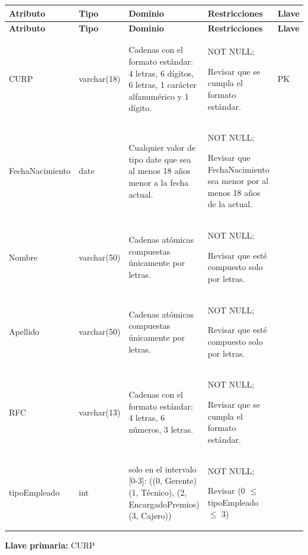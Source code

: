 \documentclass[12pt]{article}
\begin{document}
\begin{longtable}{p{3.2cm} p{2.2cm} p{4.8cm} p{4.2cm} p{1.2cm}}
\label{tab:empleado}\\
\toprule
\textbf{Atributo} & \textbf{Tipo} & \textbf{Dominio} & \textbf{Restricciones} & \textbf{Llave} \\
\midrule
\endfirsthead

\toprule
\textbf{Atributo} & \textbf{Tipo} & \textbf{Dominio} & \textbf{Restricciones} & \textbf{Llave} \\
\midrule
\endhead

\bottomrule
\endfoot

CURP 
& varchar(18) 
& Cadenas con el formato estándar: 4 letras, 6 dígitos, 6 letras, 1 carácter alfanumérico y 1 dígito.
& NOT NULL;

Revisar que se cumpla el formato estándar.
& PK \\

FechaNacimiento 
& date 
& Cualquier valor de tipo date que sea al menos 18 años menor a la fecha actual.
& NOT NULL;

Revisar que FechaNacimiento sea menor por al menos 18 años de la actual.
& \\

Nombre 
& varchar(50)
& Cadenas atómicas compuestas únicamente por letras.
& NOT NULL;

Revisar que esté compuesto solo por letras.
& \\

Apellido 
& varchar(50) 
& Cadenas atómicas compuestas únicamente por letras.
& NOT NULL;

Revisar que esté compuesto solo por letras.
& \\

RFC 
& varchar(13) 
& Cadenas con el formato estándar: 4 letras, 6 números, 3 letras.
& NOT NULL;

Revisar que se cumpla el formato estándar.
& \\

tipoEmpleado
& int
& solo en el intervalo [0-3]: ((0, Gerente) (1, Técnico), (2, EncargadoPremios) (3, Cajero))
& NOT NULL;

Revisar (0 $\leq$ tipoEmpleado $\leq$ 3)
& \\

\end{longtable}

\vspace{2pt}
\textbf{Llave primaria:} CURP\\
\end{document}
